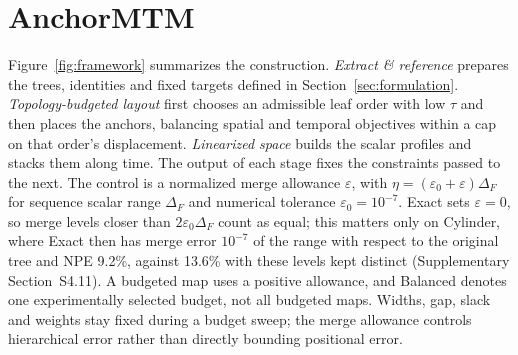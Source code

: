 \begin{figure}[!tb]
\end{figure}
\section{AnchorMTM}\label{sec:method}\label{sec:construction}

Figure~\ref{fig:framework} summarizes the construction. \emph{Extract \& reference} prepares the trees, identities and fixed targets defined in Section~\ref{sec:formulation}. \emph{Topology-budgeted layout} first chooses an admissible leaf order with low $\tau$ and then places the anchors, balancing spatial and temporal objectives within a cap on that order's displacement. \emph{Linearized space} builds the scalar profiles and stacks them along time. The output of each stage fixes the constraints passed to the next. The control is a normalized merge allowance $\varepsilon$, with $\eta=(\varepsilon_0+\varepsilon)\Delta_F$ for sequence scalar range $\Delta_F$ and numerical tolerance $\varepsilon_0=10^{-7}$. Exact sets $\varepsilon=0$, so merge levels closer than $2\varepsilon_0\Delta_F$ count as equal; this matters only on Cylinder, where Exact then has merge error $10^{-7}$ of the range with respect to the original tree and NPE 9.2\%, against 13.6\% with these levels kept distinct (Supplementary Section~S4.11). A budgeted map uses a positive allowance, and Balanced denotes one experimentally selected budget, not all budgeted maps. Widths, gap, slack and weights stay fixed during a budget sweep; the merge allowance controls hierarchical error rather than directly bounding positional error.

